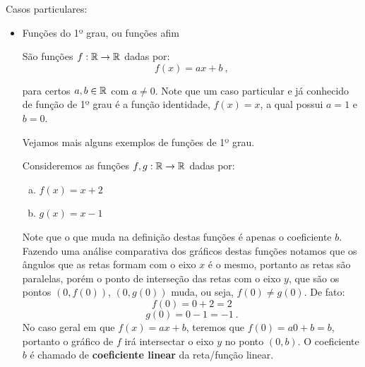  Casos particulares:
 \begin{itemize}
 \item Funções do 1º grau, ou funções afim

 São funções $f: \mathbb{R} \rightarrow \mathbb{R}$ dadas por:
 \[f(x)= ax + b \ , \]

 para certos $a, b \in \mathbb{R}$ com $a \neq 0$. Note que um caso particular e já conhecido de função de 1º grau é a função identidade, $f(x)= x$, a qual possui $a=1$ e $b=0$.

 Vejamos mais alguns exemplos de funções de 1º grau.

 Consideremos as funções $f, g: \mathbb{R} \to \mathbb{R}$ dadas por:
 \begin{enumerate}[a)]
  \item $f(x)= x+2$
  \item $g(x)= x-1$
 \end{enumerate}


 \begin{figure}[H]
  \end{figure}
  Note que o que muda na definição destas funções é apenas o coeficiente $b$. Fazendo uma análise comparativa dos gráficos destas funções notamos que os ângulos que as retas formam com o eixo $x$ é o mesmo, portanto as retas são paralelas, porém o ponto de interseção das retas com o eixo $y$, que são os pontos $(0, f(0))$, $(0, g(0))$ muda, ou seja, $f(0) \neq g(0)$. De fato:
  \[f(0)= 0 + 2= 2\]
  \[g(0)= 0 -1 = -1 \ .\]
  No caso geral em que $f(x)=ax+b$, teremos que $f(0)=a0 + b= b$, portanto o gráfico de $f$ irá intersectar o eixo $y$ no ponto $(0,b)$. O coeficiente $b$ é chamado de \textbf{coeficiente linear} da reta/função linear.


\end{itemize}
